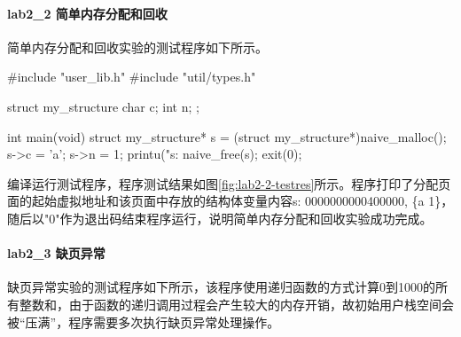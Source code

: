 \paragraph{lab2_2 简单内存分配和回收}
简单内存分配和回收实验的测试程序如下所示。
\begin{cppcode}
#include "user_lib.h"
#include "util/types.h"

struct my_structure {
  char c;
  int n;
};

int main(void) {
  struct my_structure* s = (struct my_structure*)naive_malloc();
  s->c = 'a';
  s->n = 1;
  printu("s: %
  naive_free(s);
  exit(0);
}
\end{cppcode}

编译运行测试程序，程序测试结果如图\ref{fig:lab2-2-testres}所示。程序打印了分配页面的起始虚拟地址和该页面中存放的结构体变量内容s: 0000000000400000, \{a 1\}，随后以"0"作为退出码结束程序运行，说明简单内存分配和回收实验成功完成。

\paragraph{lab2_3 缺页异常}
缺页异常实验的测试程序如下所示，该程序使用递归函数的方式计算0到1000的所有整数和，由于函数的递归调用过程会产生较大的内存开销，故初始用户栈空间会被“压满”，程序需要多次执行缺页异常处理操作。

